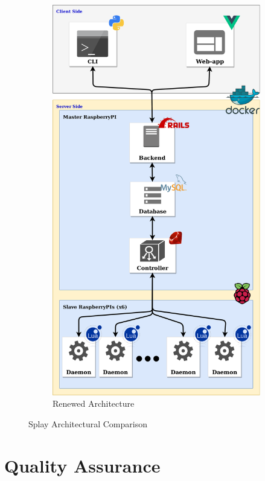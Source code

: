 \documentclass{eplmastersthesis}
\begin{document}
\begin{figure}[!tbp]
\begin{subfigure}{0.45\textwidth}
          \includegraphics[width=\textwidth]{figures/new_arch.png}
          \caption{Renewed Architecture}
        \end{subfigure}
        \caption{Splay Architectural Comparison}
        \label{fig:test}
      \end{figure}

  \chapter{Quality Assurance}
  \label{chap:qual}
\end{document}

